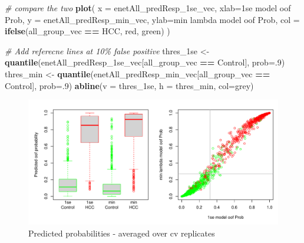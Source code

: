 \documentclass[
]{book}
\newenvironment{Shaded}{\begin{snugshade}}{\end{snugshade}}
\newcommand{\CommentTok}[1]{\textcolor[rgb]{0.56,0.35,0.01}{\textit{#1}}}
\newcommand{\DataTypeTok}[1]{\textcolor[rgb]{0.13,0.29,0.53}{#1}}
\newcommand{\DecValTok}[1]{\textcolor[rgb]{0.00,0.00,0.81}{#1}}
\newcommand{\KeywordTok}[1]{\textcolor[rgb]{0.13,0.29,0.53}{\textbf{#1}}}
\newcommand{\NormalTok}[1]{#1}
\newcommand{\OperatorTok}[1]{\textcolor[rgb]{0.81,0.36,0.00}{\textbf{#1}}}
\newcommand{\StringTok}[1]{\textcolor[rgb]{0.31,0.60,0.02}{#1}}
\begin{document}
\begin{Shaded}
\begin{Highlighting}[]
\CommentTok{\# compare the two}
\KeywordTok{plot}\NormalTok{(}
 \DataTypeTok{x =}\NormalTok{ enetAll\_predResp\_1se\_vec, }\DataTypeTok{xlab=}\StringTok{\textquotesingle{}1se model oof Prob\textquotesingle{}}\NormalTok{,}
 \DataTypeTok{y =}\NormalTok{ enetAll\_predResp\_min\_vec, }\DataTypeTok{ylab=}\StringTok{\textquotesingle{}min lambda model oof Prob\textquotesingle{}}\NormalTok{,}
 \DataTypeTok{col =} \KeywordTok{ifelse}\NormalTok{(all\_group\_vec }\OperatorTok{==}\StringTok{ \textquotesingle{}HCC\textquotesingle{}}\NormalTok{, }\StringTok{\textquotesingle{}red\textquotesingle{}}\NormalTok{, }\StringTok{\textquotesingle{}green\textquotesingle{}}\NormalTok{)}
\NormalTok{)}
 
\CommentTok{\# Add referecne lines at 10\% false positive}
\NormalTok{thres\_1se <{-}}\StringTok{ }\KeywordTok{quantile}\NormalTok{(enetAll\_predResp\_1se\_vec[all\_group\_vec }\OperatorTok{==}\StringTok{ \textquotesingle{}Control\textquotesingle{}}\NormalTok{], }\DataTypeTok{prob=}\NormalTok{.}\DecValTok{9}\NormalTok{)}
\NormalTok{thres\_min <{-}}\StringTok{ }\KeywordTok{quantile}\NormalTok{(enetAll\_predResp\_min\_vec[all\_group\_vec }\OperatorTok{==}\StringTok{ \textquotesingle{}Control\textquotesingle{}}\NormalTok{], }\DataTypeTok{prob=}\NormalTok{.}\DecValTok{9}\NormalTok{)}
\KeywordTok{abline}\NormalTok{(}\DataTypeTok{v =}\NormalTok{ thres\_1se, }\DataTypeTok{h =}\NormalTok{ thres\_min, }\DataTypeTok{col=}\StringTok{\textquotesingle{}grey\textquotesingle{}}\NormalTok{)}
\end{Highlighting}
\end{Shaded}

\begin{figure}
\centering
\includegraphics{Static/figures/enet-get-sample-pred-1.pdf}
\caption{\label{fig:enet-get-sample-pred}Predicted probabilities - averaged over cv replicates}
\end{figure}
\end{document}
